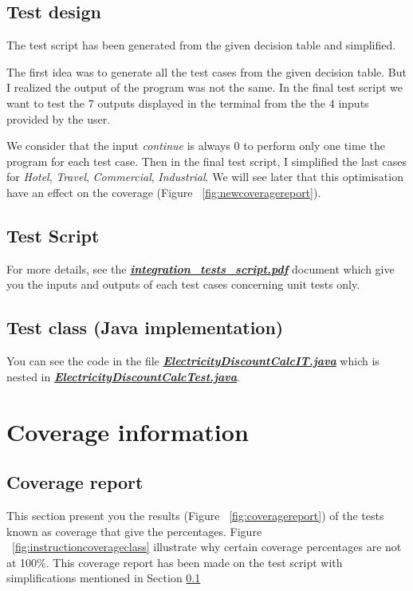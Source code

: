 \documentclass{article}
\begin{document}
    \subsection{Test design}
    \label{section:testdesignblack}

    The test script has been generated from the given decision table and simplified. 

    The first idea was to generate all the test cases from the given decision table. But I realized the output
    of the program was not the same. In the final test script we want to test the 7 outputs displayed in the terminal from the
    the 4 inputs provided by the user.

    We consider that the input \textit{continue} is always 0 to perform only one time the program for each test case.
    Then in the final test script, I simplified the last cases for \textit{Hotel}, \textit{Travel}, \textit{Commercial}, \textit{Industrial}.
    We will see later that this optimisation have an effect on the coverage (Figure  ~\ref{fig:newcoveragereport}). 

    \subsection{Test Script}

    For more details, see the \underline{\textbf{\textit{integration\_tests\_script.pdf}}}
    document which give you the inputs and outputs of each test cases concerning unit tests only.

    \subsection{Test class (Java implementation)}

    You can see the code in the file \underline{\textbf{\textit{ElectricityDiscountCalcIT.java}}} which is
    nested in \underline{\textbf{\textit{ElectricityDiscountCalcTest.java}}}.

    \newpage
   
    \section{Coverage information}

    \subsection{Coverage report}

    This section present you the results (Figure ~\ref{fig:coveragereport}) of the tests known as coverage that give the percentages. 
    Figure ~\ref{fig:instructioncoverageclass} illustrate why certain coverage percentages are not at 100\%. This coverage report has been made 
    on the test script with simplifications mentioned in Section \ref{section:testdesignblack}
\end{document}
